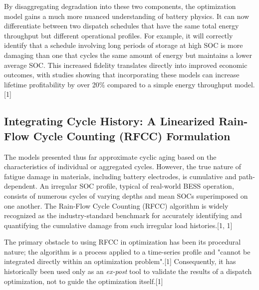 By disaggregating degradation into these two components, the optimization model gains a much more nuanced understanding of battery physics. It can now differentiate between two dispatch schedules that have the same total energy throughput but different operational profiles. For example, it will correctly identify that a schedule involving long periods of storage at high SOC is more damaging than one that cycles the same amount of energy but maintains a lower average SOC. This increased fidelity translates directly into improved economic outcomes, with studies showing that incorporating these models can increase lifetime profitability by over 20\% compared to a simple energy throughput model.[1]

\subsection{Integrating Cycle History: A Linearized Rain-Flow Cycle Counting (RFCC) Formulation}

The models presented thus far approximate cyclic aging based on the characteristics of individual or aggregated cycles. However, the true nature of fatigue damage in materials, including battery electrodes, is cumulative and path-dependent. An irregular SOC profile, typical of real-world BESS operation, consists of numerous cycles of varying depths and mean SOCs superimposed on one another. The Rain-Flow Cycle Counting (RFCC) algorithm is widely recognized as the industry-standard benchmark for accurately identifying and quantifying the cumulative damage from such irregular load histories.[1, 1]

The primary obstacle to using RFCC in optimization has been its procedural nature; the algorithm is a process applied to a time-series profile and "cannot be integrated directly within an optimization problem".[1] Consequently, it has historically been used only as an \textit{ex-post} tool to validate the results of a dispatch optimization, not to guide the optimization itself.[1]

